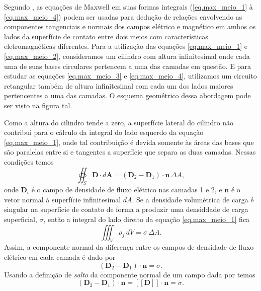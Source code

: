 Segundo \cite{jackson_classical_1999}, as equa\c{c}\~oes de Maxwell em suas formas integrais (\ref{eq.max_meio_1} \`a \ref{eq.max_meio_4}) podem ser usadas para dedu\c{c}\~ao de rela\c{c}\~oes envolvendo as componentes tangenciais e normais dos campos el\'etrico e magn\'etico em ambos os lados da superf\'icie de contato entre dois meios com caracter\'isticas eletromagn\'eticas diferentes. Para a utiliza\c{c}\~ao das equa\c{c}\~oes \ref{eq.max_meio_1} e \ref{eq.max_meio_2}, consideramos um cilindro com altura infinitesimal onde cada uma de suas bases circulares pertencem a uma das camadas em quest\~ao. E para estudar as equa\c{c}\~oes \ref{eq.max_meio_3} e \ref{eq.max_meio_4}, utilizamos um circuito retangular tamb\'em de altura infinitesimal com cada um dos lados maiores pertencentes a uma das camadas. O esquema geom\'etrico dessa abordagem pode ser visto na figura tal. 

Como a altura do cilindro tende a zero, a superf\'icie lateral do cilindro n\~ao contribui para o c\'alculo da integral do lado esquerdo da equa\c{c}\~ao \ref{eq.max_meio_1}, onde tal contribui\c{c}\~ao \'e devida somente \`as \'areas das bases que s\~ao paralelas entre si e tangentes a superf\'icie que separa as duas camadas. Nessas condi\c{c}\~oes temos
\begin{equation*}
\oiint_S\mathbf{D}\cdot d\mathbf{A} = (\mathbf{D}_2-\mathbf{D}_1)\cdot\mathbf{n}\,\Delta A,
\end{equation*}
onde $\mathbf{D}_i$ \'e o campo de densidade de fluxo el\'etrico nas camadas 1 e 2, e $\mathbf{n}$ \'e o vetor normal \`a superf\'icie infinitesimal $dA$. Se a densidade volum\'etrica de carga \'e singular na superf\'icie de contato de forma a produzir uma densiddade de carga superficial, $\sigma$, ent\~ao a integral do lado direito da equa\c{c}\~ao \ref{eq.max_meio_1} fica
\begin{equation*}
\iiint_V\rho_f\,dV=\sigma\,\Delta A.
\end{equation*}
Assim, a componente normal da diferen\c{c}a entre os campos de densidade de fluxo el\'etrico em cada camada \'e dado por
\begin{equation*}
(\mathbf{D}_2-\mathbf{D}_1)\cdot\mathbf{n}=\sigma. 
\end{equation*} 
Usando a defini\c{c}\~ao de \textit{salto} da componente normal de um campo dada por \cite{erigen_1963} temos
\begin{equation}\label{eq.gau_meio_1}
(\mathbf{D}_2-\mathbf{D}_1)\cdot\mathbf{n}=\left[\left[\mathbf{D}\right]\right]\cdot\mathbf{n}=\sigma.
\end{equation}

